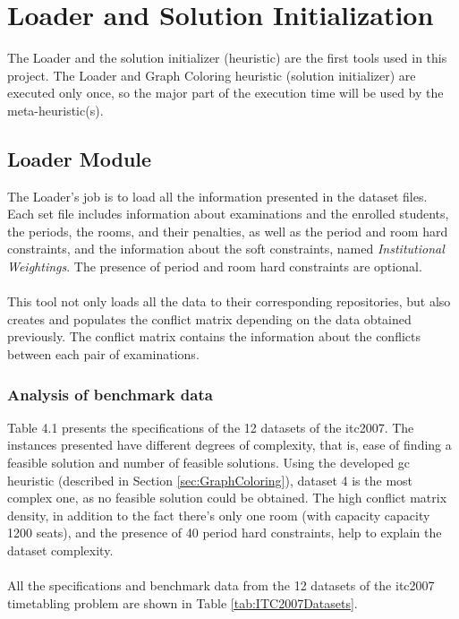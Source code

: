 \chapter{Loader and Solution Initialization}
\label{chap:SolutionInit}
\thispagestyle{plain}

The Loader and the solution initializer (heuristic) are the first tools used in this project. The Loader and Graph Coloring heuristic (solution initializer) are executed only once, so the major part of the execution time will be used by the meta-heuristic(s).

\section{Loader Module}
\label{sec:Loader}

The Loader's job is to load all the information presented in the dataset files. Each set file includes information about examinations and the enrolled students, the periods, the rooms, and their penalties, as well as the period and room hard constraints, and the information about the soft constraints, named \textit{Institutional Weightings}. The presence of period and room hard constraints are optional.\\
\\
This tool not only loads all the data to their corresponding repositories, but also creates and populates the conflict matrix depending on the data obtained previously. The conflict matrix contains the information about the conflicts between each pair of examinations.

\subsection{Analysis of benchmark data}

Table 4.1 presents the specifications of the 12 datasets of the \gls{itc2007}. The instances presented have different degrees of complexity, that is, ease of finding a feasible solution and number of feasible solutions. Using the developed \gls{gc} heuristic (described in Section \ref{sec:GraphColoring}), dataset 4 is the most complex one, as no feasible solution could be obtained. The high conflict matrix density, in addition to the fact there's only one room (with capacity capacity 1200 seats), and the presence of 40 period hard constraints, help to explain the dataset complexity.\\
\\
All the specifications and benchmark data from the 12 datasets of the \gls{itc2007} timetabling problem are shown in Table \ref{tab:ITC2007Datasets}.

